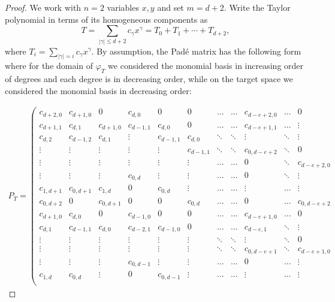 \documentclass[letterpaper,11pt]{amsart}
\theoremstyle{plain}
\theoremstyle{definition}
\begin{document}
\begin{proof}
We work with $n=2$ variables $x,y$ and set $m = d+2$. 
Write the Taylor polynomial in terms of its homogeneous components as
$$
T = \sum_{|\gamma| \leq d+2} c_\gamma x^\gamma = T_0 + T_1 + \cdots + T_{d+2},
$$
where $T_i = \sum_{|\gamma|=i} c_\gamma x^\gamma$.
By assumption, the Pad\'e matrix  has the following form where for the domain of $\varphi_T$ we considered the monomial basis in increasing order of degrees and each degree is in decreasing order, while on the target space we considered the monomial basis in decreasing order:

\begin{align*}
P_T = \left( \begin{array}{ccccccccccc} 
c_{d+2,0} & c_{d+1,0} & 0 & c_{d,0} & 0 & 0 & \dots & \dots & c_{d-e+2,0} & \dots & 0 \\
c_{d+1,1} & c_{d,1} & c_{d+1,0} & c_{d-1,1} & c_{d,0} & 0 & \dots & \dots & c_{d-e+1,1} & \dots & \vdots\\
c_{d,2} & c_{d-1,2} & c_{d,1} & \vdots & c_{d-1,1} & c_{d,0} & \ddots & \ddots & \vdots & \ddots & \vdots \\
\vdots & \vdots & \vdots & \vdots & \vdots & c_{d-1,1} & \ddots & \ddots & c_{0,d-e+2} & \ddots & 0 \\
\vdots & \vdots & \vdots & \vdots & \vdots & \vdots & \dots & \dots & 0& \ddots & c_{d-e+2,0} \\
\vdots & \vdots & \vdots & c_{0,d} & \vdots & \vdots & \dots & \dots & 0& \ddots & \vdots \\
c_{1,d+1}  & c_{0,d+1} & c_{1,d} & 0 & c_{0,d} & \vdots & \dots & \dots & \vdots & \dots & \vdots \\
c_{0,d+2} & 0 & c_{0,d+1} & 0 & 0 & c_{0,d} & \dots & \dots & 0 & \dots & c_{0,d-e+2} \\
c_{d+1,0} & c_{d,0} & 0 & c_{d-1,0} & 0 & 0 & \dots & \dots & c_{d-e+1,0} & \dots & 0 \\
c_{d,1} & c_{d-1,1} & c_{d,0} & c_{d-2,1} & c_{d-1,0} & 0 & \dots & \dots & c_{d-e,1} & \ddots & \vdots \\
\vdots & \vdots & \vdots & \vdots & \vdots & \vdots & \ddots & \ddots & \vdots & \ddots & 0 \\
\vdots & \vdots & \vdots & \vdots & \vdots & \vdots & \ddots & \ddots & c_{0,d-e+1} & \ddots & c_{d-e+1,0} \\
\vdots & \vdots & \vdots & c_{0,d-1} & \vdots & \vdots & \dots & \dots & 0 & \dots & \vdots \\
c_{1,d} & c_{0,d} & \vdots & 0 & c_{0,d-1} & \vdots & \dots & \dots & \vdots & \dots & \vdots \\

\end{array}
\end{align*}
\end{proof}
\end{document}
